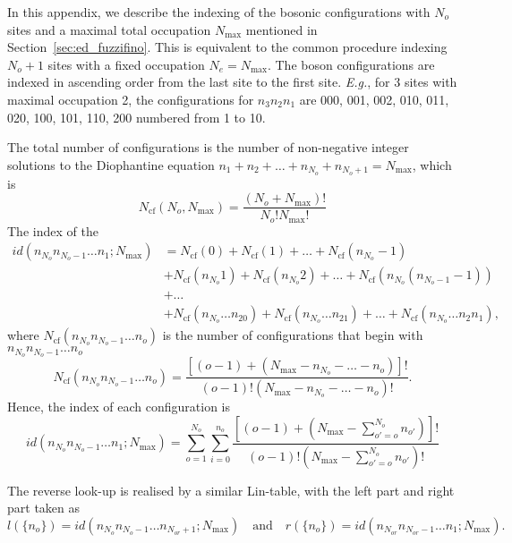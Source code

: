 \documentclass{timesjhep}
\begin{document}
In this appendix, we describe the indexing of the bosonic configurations with $N_o$ sites and a maximal total occupation $N_{\max}$ mentioned in Section~\ref{sec:ed_fuzzifino}. This is equivalent to the common procedure indexing $N_o+1$ sites with a fixed occupation $N_e=N_{\max}$. The boson configurations are indexed in ascending order from the last site to the first site. \textit{E.g.}, for 3 sites with maximal occupation 2, the configurations for $n_3n_2n_1$ are 000, 001, 002, 010, 011, 020, 100, 101, 110, 200 numbered from 1 to 10.

The total number of configurations is the number of non-negative integer solutions to the Diophantine equation $n_1+n_2+\dots+n_{N_o}+n_{N_o+1}=N_{\max}$, which is
\begin{equation}
    N_\textrm{cf}(N_o,N_{\max})=\frac{(N_o+N_{\max})!}{N_o!N_{\max}!}
\end{equation}
The index of the
\begin{align}
    \mathit{id}(n_{N_o}n_{N_o-1}\dots n_1;N_{\max})&=N_\textrm{cf}(0)+N_\textrm{cf}(1)+\dots+N_\textrm{cf}(n_{N_o}-1)\nonumber\\
    &+N_\textrm{cf}(n_{N_o}1)+N_\textrm{cf}(n_{N_o}2)+\dots+N_\textrm{cf}(n_{N_o}(n_{N_o-1}-1))\nonumber\\
    &+\dots\nonumber\\
    &+N_\textrm{cf}(n_{N_o}\dots n_20)+N_\textrm{cf}(n_{N_o}\dots n_21)+\dots+N_\textrm{cf}(n_{N_o}\dots n_2n_1),
\end{align}
where $N_\textrm{cf}(n_{N_o}n_{N_o-1}\dots n_{o})$ is the number of configurations that begin with $n_{N_o}n_{N_o-1}\dots n_{o}$
\begin{equation}
    N_\textrm{cf}(n_{N_o}n_{N_o-1}\dots n_{o})=\frac{[(o-1)+(N_{\max}-n_{N_o}-\dots-n_o)]!}{(o-1)!(N_{\max}-n_{N_o}-\dots-n_o)!}.
\end{equation}
Hence, the index of each configuration is
\begin{equation}
    \mathit{id}(n_{N_o}n_{N_o-1}\dots n_1;N_{\max})=\sum_{o=1}^{N_o}\sum_{i=0}^{n_o}\frac{\left[(o-1)+\left(N_{\max}-\sum_{o'=o}^{N_o}n_{o'}\right)\right]!}{(o-1)!\left(N_{\max}-\sum_{o'=o}^{N_o}n_{o'}\right)!}
\end{equation}

The reverse look-up is realised by a similar Lin-table, with the left part and right part taken as
\begin{equation}
    l(\{n_o\})=\mathit{id}(n_{N_o}n_{N_o-1}\dots n_{N_{or}+1};N_{\max})\quad\textrm{and}\quad r(\{n_o\})=\mathit{id}(n_{N_{or}}n_{N_{or}-1}\dots n_{1};N_{\max}).
\end{equation}
\end{document}
